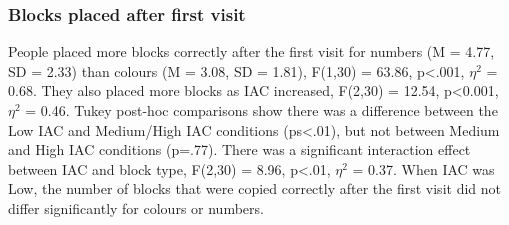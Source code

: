 \subsubsection{Blocks placed after first visit}
People placed more blocks correctly after the first visit for numbers (M = 4.77, SD = 2.33) than colours (M = 3.08, SD = 1.81), F(1,30) = 63.86, p<.001, $\eta^2$  = 0.68. They also placed more blocks as IAC increased, F(2,30) = 12.54, p<0.001, $\eta^2$  = 0.46. Tukey post-hoc comparisons show there was a difference between the Low IAC and Medium/High IAC conditions (ps<.01), but not between Medium and High IAC conditions (p=.77). There was a significant interaction effect between IAC and block type, F(2,30) = 8.96, p<.01, $\eta^2$  = 0.37. When IAC was Low, the number of blocks that were copied correctly after the first visit did not differ significantly for colours or numbers.

